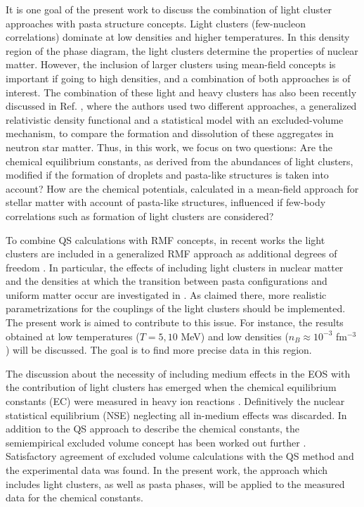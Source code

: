 \documentclass[aps,prc,nofootinbib,twocolumn,showpacs]{revtex4-1}
\begin{document}
It is one goal of the present work to discuss the combination of 
light cluster approaches with pasta structure concepts. 
Light clusters (few-nucleon correlations) dominate at low densities and higher temperatures. 
In this density region of the phase diagram, the light clusters
determine the properties of nuclear matter. 
However, the inclusion of larger clusters using mean-field concepts is important 
if going to high densities, and a combination of both approaches is of interest. The combination of these light and heavy clusters has also been recently discussed in Ref. \cite{pais16}, where the authors used two different approaches, a generalized relativistic density functional and a statistical model with an excluded-volume mechanism, to compare the formation and dissolution of these aggregates in neutron star matter.  
Thus,  in this work, we focus on two questions: 
Are the chemical equilibrium constants, as derived from the abundances of light clusters, modified 
if the formation of droplets and pasta-like structures is taken into account?
How are the chemical potentials, calculated in a mean-field approach for stellar matter
with account of pasta-like structures, influenced if few-body correlations such as 
formation of light clusters are considered?

To combine QS calculations with RMF concepts, in recent works the light clusters are included in a
generalized RMF approach as additional degrees of freedom \cite{PCP15,typel10,ferreira12}. 
In particular, the effects of including light clusters in nuclear matter and the densities 
at which the transition between pasta configurations and uniform matter occur 
are investigated in \cite{PCP15}. As claimed there, more realistic parametrizations 
for the couplings of the light clusters should be implemented. 
The present work is aimed to contribute to this issue. 
For instance, the results obtained at low temperatures ($T=5, 10$ MeV) and low densities 
($n_B \approx 10^{-3}$ fm$^{-3}$) will be discussed. The goal is to find more precise data in this region.

The discussion about the necessity of including medium effects in the
EOS with the contribution of light clusters has emerged when the
chemical equilibrium constants (EC) were measured in heavy ion reactions \cite{qin12}. 
Definitively the nuclear statistical equilibrium (NSE) neglecting all in-medium effects was discarded. 
In addition to the QS approach to describe the chemical constants, 
the semiempirical excluded volume concept has been worked out further \cite{hempel2015}. 
Satisfactory agreement of excluded volume calculations with the QS method and the experimental data was found. 
In the present work, the approach which includes light clusters, as well as pasta phases, 
will be applied to the measured data for the chemical constants.
\end{document}
